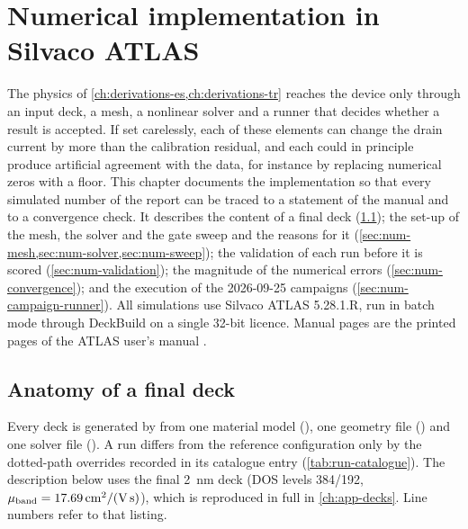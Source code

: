 \chapter{Numerical implementation in Silvaco ATLAS}\label{ch:numerics}

The physics of \cref{ch:derivations-es,ch:derivations-tr} reaches the device only through an input deck, a mesh, a
nonlinear solver and a runner that decides whether a result is accepted. If set carelessly, each of these elements can
change the drain current by more than the calibration residual, and each could in principle produce artificial agreement
with the data, for instance by replacing numerical zeros with a floor. This chapter documents the implementation so that
every simulated number of the report can be traced to a statement of the manual and to a convergence check. It describes
the content of a final deck (\cref{sec:num-deck}); the set-up of the mesh, the solver and the gate sweep and the reasons
for it (\cref{sec:num-mesh,sec:num-solver,sec:num-sweep}); the validation of each run before it is scored
(\cref{sec:num-validation}); the magnitude of the numerical errors (\cref{sec:num-convergence}); and the execution of the
2026-09-25 campaigns (\cref{sec:num-campaign-runner}). All simulations use Silvaco ATLAS 5.28.1.R, run in batch mode
through DeckBuild on a single 32-bit licence. Manual pages are the printed pages of the ATLAS user's manual
\citep{AtlasManual}.

\section{Anatomy of a final deck}\label{sec:num-deck}

Every deck is generated by  from one material model
(), one geometry file () and one solver file
(). A run differs from the reference configuration only by the dotted-path overrides recorded
in its catalogue entry (\cref{tab:run-catalogue}). The description below uses the final \SI{2}{nm} deck 
(DOS levels 384/192, $\mu_{\mathrm{band}} = \SI{17.69}{cm^2/(V.s)}$), which is reproduced in full in \cref{ch:app-decks}. Line
numbers refer to that listing.

